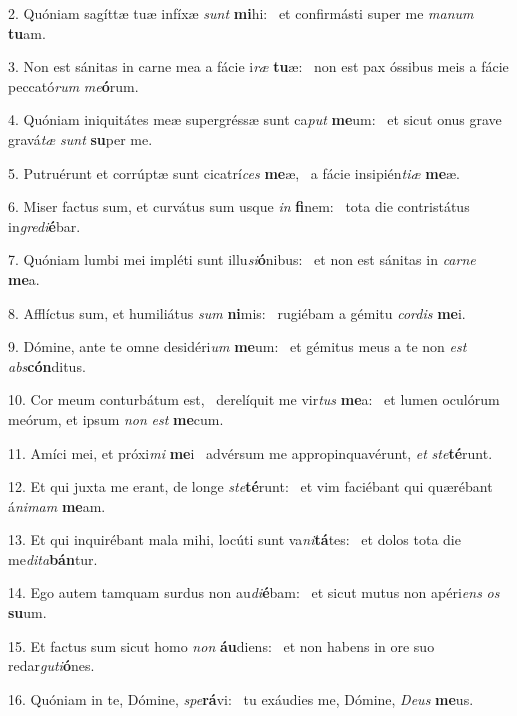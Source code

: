 2. Quóniam sagíttæ tuæ infíxæ \textit{sunt} \textbf{mi}hi: \ast\  et confirmásti super me \textit{ma}\textit{num} \textbf{tu}am.\

3. Non est sánitas in carne mea a fácie i\textit{ræ} \textbf{tu}æ: \ast\  non est pax óssibus meis a fácie peccató\textit{rum} \textit{me}\textbf{ó}rum.\

4. Quóniam iniquitátes meæ supergréssæ sunt ca\textit{put} \textbf{me}um: \ast\  et sicut onus grave gravá\textit{tæ} \textit{sunt} \textbf{su}per me.\

5. Putruérunt et corrúptæ sunt cicatrí\textit{ces} \textbf{me}æ, \ast\  a fácie insipién\textit{ti}\textit{æ} \textbf{me}æ.\

6. Miser factus sum, et curvátus sum usque \textit{in} \textbf{fi}nem: \ast\  tota die contristátus in\textit{gre}\textit{di}\textbf{é}bar.\

7. Quóniam lumbi mei impléti sunt illu\textit{si}\textbf{ó}nibus: \ast\  et non est sánitas in \textit{car}\textit{ne} \textbf{me}a.\

8. Afflíctus sum, et humiliátus \textit{sum} \textbf{ni}mis: \ast\  rugiébam a gémitu \textit{cor}\textit{dis} \textbf{me}i.\

9. Dómine, ante te omne desidéri\textit{um} \textbf{me}um: \ast\  et gémitus meus a te non \textit{est} \textit{abs}\textbf{cón}ditus.\

10. Cor meum conturbátum est, \dag\  derelíquit me vir\textit{tus} \textbf{me}a: \ast\  et lumen oculórum meórum, et ipsum \textit{non} \textit{est} \textbf{me}cum.\

11. Amíci mei, et próxi\textit{mi} \textbf{me}i \ast\  advérsum me appropinquavérunt, \textit{et} \textit{ste}\textbf{té}runt.\

12. Et qui juxta me erant, de longe \textit{ste}\textbf{té}runt: \ast\  et vim faciébant qui quærébant á\textit{ni}\textit{mam} \textbf{me}am.\

13. Et qui inquirébant mala mihi, locúti sunt va\textit{ni}\textbf{tá}tes: \ast\  et dolos tota die me\textit{di}\textit{ta}\textbf{bán}tur.\

14. Ego autem tamquam surdus non au\textit{di}\textbf{é}bam: \ast\  et sicut mutus non apéri\textit{ens} \textit{os} \textbf{su}um.\

15. Et factus sum sicut homo \textit{non} \textbf{áu}diens: \ast\  et non habens in ore suo redar\textit{gu}\textit{ti}\textbf{ó}nes.\

16. Quóniam in te, Dómine, \textit{spe}\textbf{rá}vi: \ast\  tu exáudies me, Dómine, \textit{De}\textit{us} \textbf{me}us.\

